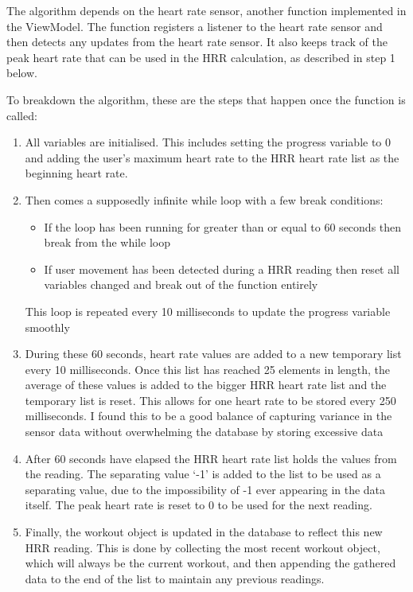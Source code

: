 \documentclass{l4proj}
\begin{document}
The algorithm depends on the heart rate sensor, another function implemented in the ViewModel. The function registers a listener to the heart rate sensor and then detects any updates from the heart rate sensor. It also keeps track of the peak heart rate that can be used in the HRR calculation, as described in step 1 below. 

To breakdown the algorithm, these are the steps that happen once the function is called:

\begin{enumerate}
    \item All variables are initialised. This includes setting the progress variable to 0 and adding the user’s maximum heart rate to the HRR heart rate list as the beginning heart rate.
    \item Then comes a supposedly infinite while loop with a few break conditions:
    \begin{itemize}
        \item If the loop has been running for greater than or equal to 60 seconds then break from the while loop
        \item If user movement has been detected during a HRR reading then reset all variables changed and break out of the function entirely
    \end{itemize}
    This loop is repeated every 10 milliseconds to update the progress variable smoothly
    \item During these 60 seconds, heart rate values are added to a new temporary list every 10 milliseconds. Once this list has reached 25 elements in length, the average of these values is added to the bigger HRR heart rate list and the temporary list is reset. This allows for one heart rate to be stored every 250 milliseconds. I found this to be a good balance of capturing variance in the sensor data without overwhelming the database by storing excessive data
    \item After 60 seconds have elapsed the HRR heart rate list holds the values from the reading. The separating value ‘-1’ is added to the list to be used as a separating value, due to the impossibility of -1 ever appearing in the data itself. The peak heart rate is reset to 0 to be used for the next reading.
    \item Finally, the workout object is updated in the database to reflect this new HRR reading. This is done by collecting the most recent workout object, which will always be the current workout, and then appending the gathered data to the end of the list to maintain any previous readings.
\end{enumerate}
\end{document}
